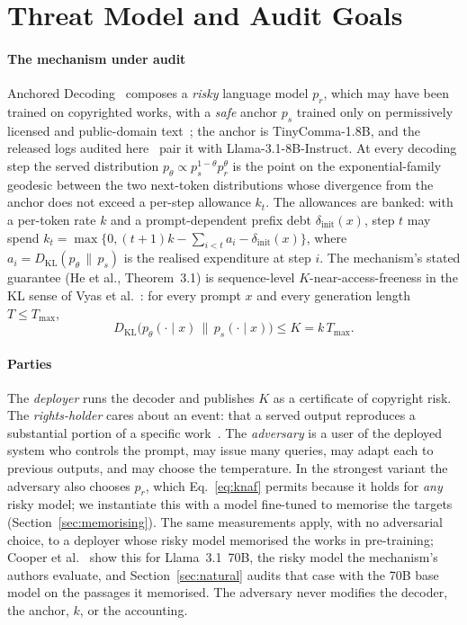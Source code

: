\section{Threat Model and Audit Goals}\label{sec:threat}

\paragraph{The mechanism under audit}
Anchored Decoding~\cite{he2026anchored} composes a \emph{risky} language model $p_r$, which may have been trained on copyrighted works, with a \emph{safe} anchor $p_s$ trained only on permissively licensed and public-domain text~\cite{kandpal2025commonpile}; the anchor is TinyComma-1.8B, and the released logs audited here~\cite{vijayavallabh2026audit} pair it with Llama-3.1-8B-Instruct. At every decoding step the served distribution $p_\theta \propto p_s^{1-\theta} p_r^{\theta}$ is the point on the exponential-family geodesic between the two next-token distributions whose divergence from the anchor does not exceed a per-step allowance $k_t$. The allowances are banked: with a per-token rate $k$ and a prompt-dependent prefix debt $\delta_{\mathrm{init}}(x)$, step $t$ may spend $k_t = \max\{0, (t+1)k - \sum_{i<t} a_i - \delta_{\mathrm{init}}(x)\}$, where $a_i = D_{\mathrm{KL}}(p_\theta \,\|\, p_s)$ is the realised expenditure at step $i$. The mechanism's stated guarantee (He et al., Theorem~3.1) is sequence-level $K$-near-access-freeness in the KL sense of Vyas et al.~\cite{vyas2023provable}: for every prompt $x$ and every generation length $T \le T_{\max}$,
\begin{equation}
D_{\mathrm{KL}}\bigl(p_\theta(\cdot \mid x)\,\|\,p_s(\cdot \mid x)\bigr) \le K = k\,T_{\max}.
\label{eq:knaf}
\end{equation}

\paragraph{Parties}
The \emph{deployer} runs the decoder and publishes $K$ as a certificate of copyright risk. The \emph{rights-holder} cares about an event: that a served output reproduces a substantial portion of a specific work~\cite{cooper2025files,haviv2026separate}. The \emph{adversary} is a user of the deployed system who controls the prompt, may issue many queries, may adapt each to previous outputs, and may choose the temperature. In the strongest variant the adversary also chooses $p_r$, which Eq.~\eqref{eq:knaf} permits because it holds for \emph{any} risky model; we instantiate this with a model fine-tuned to memorise the targets (Section~\ref{sec:memorising}). The same measurements apply, with no adversarial choice, to a deployer whose risky model memorised the works in pre-training; Cooper et al.~\cite{cooper2025extracting} show this for Llama~3.1~70B, the risky model the mechanism's authors evaluate, and Section~\ref{sec:natural} audits that case with the 70B base model on the passages it memorised. The adversary never modifies the decoder, the anchor, $k$, or the accounting.

